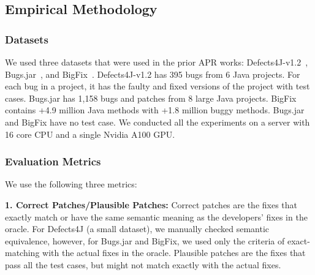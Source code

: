 \subsection{Empirical Methodology}
\label{eval-methodology:sec}

\subsubsection{Datasets}
We used three datasets that were used in the prior APR works:
Defects4J-v1.2~\cite{defects4j}, Bugs.jar~\cite{saha2018bugs}, and
BigFix~\cite{yioopsla19}. Defects4J-v1.2 has 395 bugs from 6 Java
projects. For each bug in a project, it has the faulty and fixed
versions of the project with test cases. Bugs.jar has 1,158 bugs and
patches from 8 large Java projects. BigFix contains +4.9 million Java
methods with +1.8 million buggy methods. Bugs.jar and BigFix have
no test case. We conducted all the experiments on a
server with 16 core CPU and a single Nvidia A100 GPU.


\subsubsection{Evaluation Metrics}

We use the following three metrics:


{\bf 1. Correct Patches/Plausible Patches:} Correct patches are the
fixes that exactly match or have the same semantic meaning as the
developers' fixes in the oracle. For Defects4J (a small dataset), we
manually checked semantic equivalence, however, for Bugs.jar and
BigFix, we used only the criteria of exact-matching with the actual
fixes in the oracle.
%
Plausible patches are the fixes that pass all the test cases, but
might not match exactly with the actual fixes.

